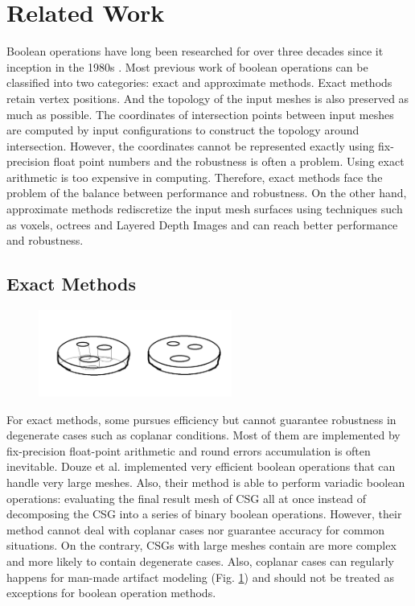 \documentclass[10pt,journal,compsoc]{IEEEtran}
\begin{document}
\section{Related Work}

Boolean operations have long been researched for over three decades since it inception in the 1980s \cite{requicha1985boolean, laidlaw1986constructive}. Most previous work of boolean operations can be classified into two categories: exact and approximate methods. Exact methods retain vertex positions. And the topology of the input meshes is also preserved as much as possible. The coordinates of intersection points between input meshes are computed by input configurations to construct the topology around intersection. However, the coordinates cannot be represented exactly using fix-precision float point numbers and the robustness is often a problem. Using exact arithmetic is too expensive in computing. Therefore, exact methods face the problem of the balance between performance and robustness. On the other hand, approximate methods rediscretize the input mesh surfaces using techniques such as voxels, octrees and Layered Depth Images and can reach better performance and robustness.

\subsection{Exact Methods}

\begin{figure}[t]
\centering
\includegraphics[width=2.5in]{coplanarexample}
\caption{{\color{red}{Sketch: the example of coplanar cases in a boolean operations with four cylinders}}}
\label{fig:coplanarexample}
\end{figure}


For exact methods, some \cite{ogayar2015deferred,douze2015quickcsg,zhou2016mesh,xu2013fast,feito2013fast} pursues efficiency but cannot guarantee robustness in degenerate cases such as coplanar conditions. Most of them are implemented by fix-precision float-point arithmetic and round errors accumulation is often inevitable. Douze et al. \cite{douze2015quickcsg} implemented very efficient boolean operations that can handle very large meshes. Also, their method is able to perform variadic boolean operations: evaluating the final result mesh of CSG all at once instead of decomposing the CSG into a series of binary boolean operations. However, their method cannot deal with coplanar cases nor guarantee accuracy for common situations. On the contrary, CSGs with large meshes contain are more complex and more likely to contain degenerate cases. Also, coplanar cases can regularly happens for man-made artifact modeling (Fig. \ref{fig:coplanarexample}) and should not be treated as exceptions for boolean operation methods.
\end{document}
